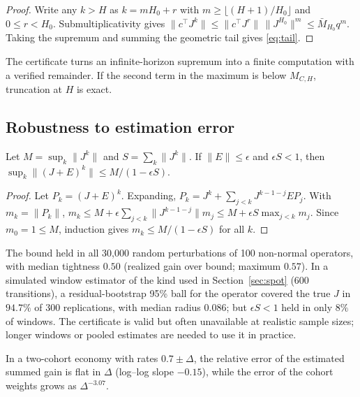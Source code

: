 \begin{proof}
Write any $k>H$ as $k=mH_0+r$ with $m\ge\lfloor(H+1)/H_0\rfloor$ and $0\le r<H_0$. Submultiplicativity gives $\|c^\top J^k\|\le\|c^\top J^r\|\,\|J^{H_0}\|^m\le\bar M_{H_0}q^m$. Taking the supremum and summing the geometric tail gives \eqref{eq:tail}.
\end{proof}

The certificate turns an infinite-horizon supremum into a finite computation with a verified remainder. If the second term in the maximum is below $M_{C,H}$, truncation at $H$ is exact.

\subsection{Robustness to estimation error}

\begin{theorem}\label{thm:robust}
Let $M=\sup_k\|J^k\|$ and $S=\sum_k\|J^k\|$. If $\|E\|\le\epsilon$ and $\epsilon S<1$, then $\sup_k\|(J+E)^k\|\le M/(1-\epsilon S)$.
\end{theorem}

\begin{proof}
Let $P_k=(J+E)^k$. Expanding, $P_k=J^k+\sum_{j<k}J^{k-1-j}EP_j$. With $m_k=\|P_k\|$, $m_k\le M+\epsilon\sum_{j<k}\|J^{k-1-j}\|m_j\le M+\epsilon S\max_{j<k}m_j$. Since $m_0=1\le M$, induction gives $m_k\le M/(1-\epsilon S)$ for all $k$.
\end{proof}

The bound held in all 30,000 random perturbations of 100 non-normal operators, with median tightness $0.50$ (realized gain over bound; maximum $0.57$). In a simulated window estimator of the kind used in Section~\ref{sec:spot} (600 transitions), a residual-bootstrap 95\% ball for the operator covered the true $J$ in $94.7\%$ of 300 replications, with median radius $0.086$; but $\epsilon S<1$ held in only $8\%$ of windows. The certificate is valid but often unavailable at realistic sample sizes; longer windows or pooled estimates are needed to use it in practice.

\begin{proposition}\label{prop:bridge}
In a two-cohort economy with rates $0.7\pm\Delta$, the relative error of the estimated summed gain is flat in $\Delta$ (log--log slope $-0.15$), while the error of the cohort weights grows as $\Delta^{-3.07}$.
\end{proposition}

